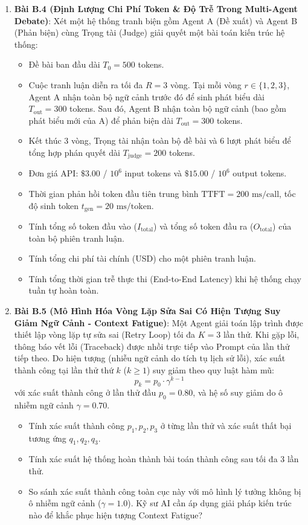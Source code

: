 \begin{enumerate}
  \item \textbf{Bài B.4 (Định Lượng Chi Phí Token \& Độ Trễ Trong Multi-Agent Debate)}:
  Xét một hệ thống tranh biện gồm Agent A (Đề xuất) và Agent B (Phản biện) cùng Trọng tài (Judge) giải quyết một bài toán kiến trúc hệ thống:
  \begin{itemize}
    \item Đề bài ban đầu dài $T_0 = 500$ tokens.
    \item Cuộc tranh luận diễn ra tối đa $R = 3$ vòng. Tại mỗi vòng $r \in \{1, 2, 3\}$, Agent A nhận toàn bộ ngữ cảnh trước đó để sinh phát biểu dài $T_{\text{out}} = 300$ tokens. Sau đó, Agent B nhận toàn bộ ngữ cảnh (bao gồm phát biểu mới của A) để phản biện dài $T_{\text{out}} = 300$ tokens.
    \item Kết thúc 3 vòng, Trọng tài nhận toàn bộ đề bài và 6 lượt phát biểu để tổng hợp phán quyết dài $T_{\text{judge}} = 200$ tokens.
    \item Đơn giá API: $\$3.00$ / $10^6$ input tokens và $\$15.00$ / $10^6$ output tokens.
    \item Thời gian phản hồi token đầu tiên trung bình $\text{TTFT} = 200\text{ ms/call}$, tốc độ sinh token $t_{\text{gen}} = 20\text{ ms/token}$.
  \end{itemize}
  \begin{itemize}
    \item[a)] Tính tổng số token đầu vào ($I_{\text{total}}$) và tổng số token đầu ra ($O_{\text{total}}$) của toàn bộ phiên tranh luận.
    \item[b)] Tính tổng chi phí tài chính (USD) cho một phiên tranh luận.
    \item[c)] Tính tổng thời gian trễ thực thi (End-to-End Latency) khi hệ thống chạy tuần tự hoàn toàn.
  \end{itemize}

  \item \textbf{Bài B.5 (Mô Hình Hóa Vòng Lặp Sửa Sai Có Hiện Tượng Suy Giảm Ngữ Cảnh - Context Fatigue)}:
  Một Agent giải toán lập trình được thiết lập vòng lặp tự sửa sai (Retry Loop) tối đa $K = 3$ lần thử. Khi gặp lỗi, thông báo vết lỗi (Traceback) được nhồi trực tiếp vào Prompt của lần thử tiếp theo.
  Do hiện tượng  (nhiễu ngữ cảnh do tích tụ lịch sử lỗi), xác suất thành công tại lần thử thứ $k$ ($k \ge 1$) suy giảm theo quy luật hàm mũ:
  \begin{equation*}
  p_k = p_0 \cdot \gamma^{k-1}
  \end{equation*}
  với xác suất thành công ở lần thử đầu $p_0 = 0.80$, và hệ số suy giảm do ô nhiễm ngữ cảnh $\gamma = 0.70$.
  \begin{itemize}
    \item[a)] Tính xác suất thành công $p_1, p_2, p_3$ ở từng lần thử và xác suất thất bại tương ứng $q_1, q_2, q_3$.
    \item[b)] Tính xác suất hệ thống hoàn thành bài toán thành công sau tối đa 3 lần thử.
    \item[c)] So sánh xác suất thành công toàn cục này với mô hình lý tưởng không bị ô nhiễm ngữ cảnh ($\gamma = 1.0$). Kỹ sư AI cần áp dụng giải pháp kiến trúc nào để khắc phục hiện tượng Context Fatigue?
  \end{itemize}


\end{enumerate}
